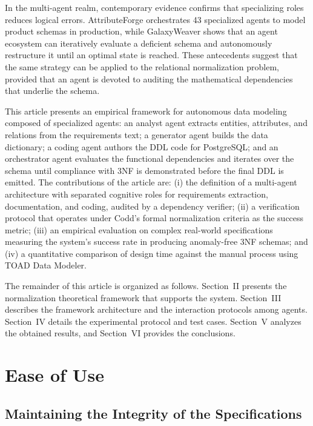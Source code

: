 \documentclass[conference]{IEEEtran}
\begin{document}
In the multi-agent realm, contemporary evidence confirms that specializing roles reduces logical errors. AttributeForge \cite{huang2025attributeforge} orchestrates 43 specialized agents to model product schemas in production, while GalaxyWeaver \cite{tong2025galaxyweaver} shows that an agent ecosystem can iteratively evaluate a deficient schema and autonomously restructure it until an optimal state is reached. These antecedents suggest that the same strategy can be applied to the relational normalization problem, provided that an agent is devoted to auditing the mathematical dependencies that underlie the schema.

This article presents an empirical framework for autonomous data modeling composed of specialized agents: an analyst agent extracts entities, attributes, and relations from the requirements text; a generator agent builds the data dictionary; a coding agent authors the DDL code for PostgreSQL; and an orchestrator agent evaluates the functional dependencies and iterates over the schema until compliance with 3NF is demonstrated before the final DDL is emitted. The contributions of the article are: (i) the definition of a multi-agent architecture with separated cognitive roles for requirements extraction, documentation, and coding, audited by a dependency verifier; (ii) a verification protocol that operates under Codd's formal normalization criteria \cite{codd1971} as the success metric; (iii) an empirical evaluation on complex real-world specifications measuring the system's success rate in producing anomaly-free 3NF schemas; and (iv) a quantitative comparison of design time against the manual process using TOAD Data Modeler.

The remainder of this article is organized as follows. Section~II presents the normalization theoretical framework that supports the system. Section~III describes the framework architecture and the interaction protocols among agents. Section~IV details the experimental protocol and test cases. Section~V analyzes the obtained results, and Section~VI provides the conclusions.

\section{Ease of Use}

\subsection{Maintaining the Integrity of the Specifications}
\end{document}
